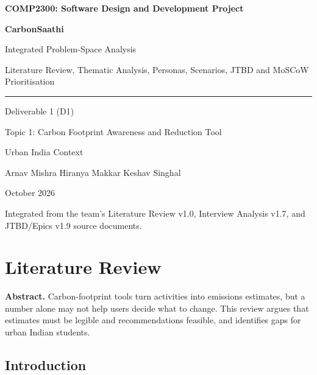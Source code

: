 \documentclass[12pt, a4paper]{article}
\begin{document}
\begin{titlepage}
\centering
\vspace*{2.0cm}
{\Large\bfseries\textcolor{cNavy}{COMP2300: Software Design and Development Project}\par}
\vspace{0.8cm}
{\huge\bfseries\textcolor{cNavy}{CarbonSaathi}\par}
\vspace{0.35cm}
{\Large Integrated Problem-Space Analysis\par}
\vspace{0.25cm}
{\large Literature Review, Thematic Analysis, Personas, Scenarios, JTBD and MoSCoW Prioritisation\par}
\vspace{1cm}
{\color{cTerracotta}\rule{0.75\textwidth}{1pt}\par}
\vspace{1cm}
{\large Deliverable 1 (D1) \par}
\vspace{0.4cm}
{\large Topic 1: Carbon Footprint Awareness and Reduction Tool\par}
{\large Urban India Context\par}
\vfill
{\normalsize Arnav Mishra \quad Hiranya Makkar \quad Keshav Singhal\par}
\vspace{0.3cm}
{\normalsize October 2026\par}
\vspace{0.5cm}
{\small Integrated from the team's Literature Review v1.0, Interview Analysis v1.7, and JTBD/Epics v1.9 source documents.\par}
\end{titlepage}

\tableofcontents
\clearpage

\section{Literature Review}
\noindent\textbf{Abstract.} Carbon-footprint tools turn activities into emissions estimates, but a number alone may not help users decide what to change. This review argues that estimates must be legible and recommendations feasible, and identifies gaps for urban Indian students.

\subsection{Introduction}
\end{document}
